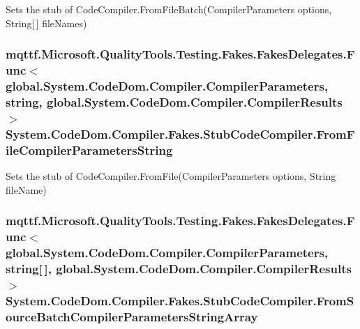 Sets the stub of Code\-Compiler.\-From\-File\-Batch(\-Compiler\-Parameters options, String\mbox{[}$\,$\mbox{]} file\-Names)

\hypertarget{class_system_1_1_code_dom_1_1_compiler_1_1_fakes_1_1_stub_code_compiler_a2aa85db45f5b6ff1a81dcbb2aaf18166}{
\subsubsection[{From\-File\-Compiler\-Parameters\-String}]{\setlength{\rightskip}{0pt plus 5cm}mqttf.\-Microsoft.\-Quality\-Tools.\-Testing.\-Fakes.\-Fakes\-Delegates.\-Func$<$global.\-System.\-Code\-Dom.\-Compiler.\-Compiler\-Parameters, string, global.\-System.\-Code\-Dom.\-Compiler.\-Compiler\-Results$>$ System.\-Code\-Dom.\-Compiler.\-Fakes.\-Stub\-Code\-Compiler.\-From\-File\-Compiler\-Parameters\-String}}\label{class_system_1_1_code_dom_1_1_compiler_1_1_fakes_1_1_stub_code_compiler_a2aa85db45f5b6ff1a81dcbb2aaf18166}


Sets the stub of Code\-Compiler.\-From\-File(\-Compiler\-Parameters options, String file\-Name)

\hypertarget{class_system_1_1_code_dom_1_1_compiler_1_1_fakes_1_1_stub_code_compiler_a473d99cb2460d11bf86220e40dddca7c}{
\subsubsection[{From\-Source\-Batch\-Compiler\-Parameters\-String\-Array}]{\setlength{\rightskip}{0pt plus 5cm}mqttf.\-Microsoft.\-Quality\-Tools.\-Testing.\-Fakes.\-Fakes\-Delegates.\-Func$<$global.\-System.\-Code\-Dom.\-Compiler.\-Compiler\-Parameters, string\mbox{[}$\,$\mbox{]}, global.\-System.\-Code\-Dom.\-Compiler.\-Compiler\-Results$>$ System.\-Code\-Dom.\-Compiler.\-Fakes.\-Stub\-Code\-Compiler.\-From\-Source\-Batch\-Compiler\-Parameters\-String\-Array}}\label{class_system_1_1_code_dom_1_1_compiler_1_1_fakes_1_1_stub_code_compiler_a473d99cb2460d11bf86220e40dddca7c}


